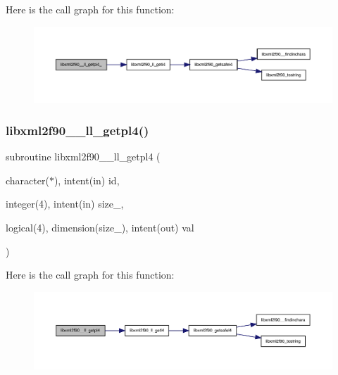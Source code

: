 Here is the call graph for this function\+:
\nopagebreak
\begin{figure}[H]
\begin{center}
\leavevmode
\includegraphics[width=350pt]{libxml2f90_8f90__pp_8f90_a3c828932bda4b9d96cb11bac75a064f2_cgraph}
\end{center}
\end{figure}
\mbox{\label{libxml2f90_8f90__pp_8f90_aae0db9dc81cd11d2c8f85d42f01321e5}} 
\subsubsection{\texorpdfstring{libxml2f90\+\_\+\+\_\+ll\+\_\+getpl4()}{libxml2f90\_\_ll\_getpl4()}}
{\footnotesize\ttfamily subroutine libxml2f90\+\_\+\+\_\+ll\+\_\+getpl4 (\begin{DoxyParamCaption}\item[{character($\ast$), intent(in)}]{id,  }\item[{integer(4), intent(in)}]{size\+\_\+,  }\item[{logical(4), dimension(size\+\_\+), intent(out)}]{val }\end{DoxyParamCaption})}

Here is the call graph for this function\+:
\nopagebreak
\begin{figure}[H]
\begin{center}
\leavevmode
\includegraphics[width=350pt]{libxml2f90_8f90__pp_8f90_aae0db9dc81cd11d2c8f85d42f01321e5_cgraph}
\end{center}
\end{figure}
\mbox{\label{libxml2f90_8f90__pp_8f90_ac77032833d26c0b15ec204a9b8bd5888}} 
